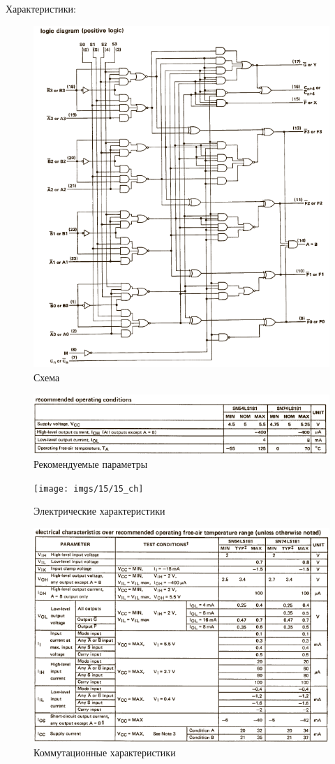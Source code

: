 Характеристики:

\begin{figure}[H]
	\centering
	\includegraphics[width=0.95\linewidth]{imgs/15/15_sh}
	\caption{Схема}
	\label{fig:15_sh}
\end{figure}

\begin{figure}[H]
	\centering
	\includegraphics[width=0.95\linewidth]{imgs/15/15_rec}
	\caption{Рекомендуемые параметры}
	\label{fig:15_rec}
\end{figure}

\begin{figure}[H]
	\centering
	\texttt{[image: imgs/15/15\_ch]}
	\caption{Электрические характеристики}
	\label{fig:15_el}
\end{figure}

\begin{figure}[H]
	\centering
	\includegraphics[width=0.95\linewidth]{imgs/15/15_switch}
	\caption{Коммутационные характеристики}
	\label{fig:15_switch}
\end{figure}

